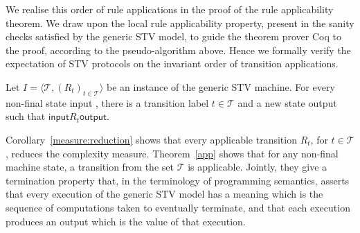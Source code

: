 \documentclass{llncs}
\begin{document}
%
 \noindent
 We realise this order of rule applications in the
 proof of the rule applicability theorem.  We draw upon the local
 rule applicability property, present in the sanity checks
 satisfied by the generic STV model, to guide the theorem prover Coq
 to the proof, according to the pseudo-algorithm above.
 Hence we formally verify the expectation of STV protocols on the
 invariant order of transition applications.
\begin{theorem}\label{app}
Let $I = \langle \mathcal{T}, (R_t)_{t \in \mathcal{T}} \rangle$ be
an instance of the generic STV machine.  For every
non-final state \textsf{input} ,
there is a 
transition label $t \in \mathcal{T}$ and 
a new state \textsf{output} such that 
$\mathsf{input}\mathrel{R_t}\mathsf{output}$.
\end{theorem}


\noindent
Corollary~\ref{measure:reduction} shows that every applicable transition
$R_t$, for $t \in \mathcal{T}$, 
reduces the complexity measure. 
Theorem~\ref{app} shows that for any non-final machine state,  a
transition from the set $\mathcal{T}$ is applicable. Jointly, they
give a termination property that, in
the terminology of programming semantics, asserts that every execution of the generic STV model has a meaning which is the sequence of computations taken to eventually terminate, and that each execution produces an output which is the value of that execution. 
\end{document}
